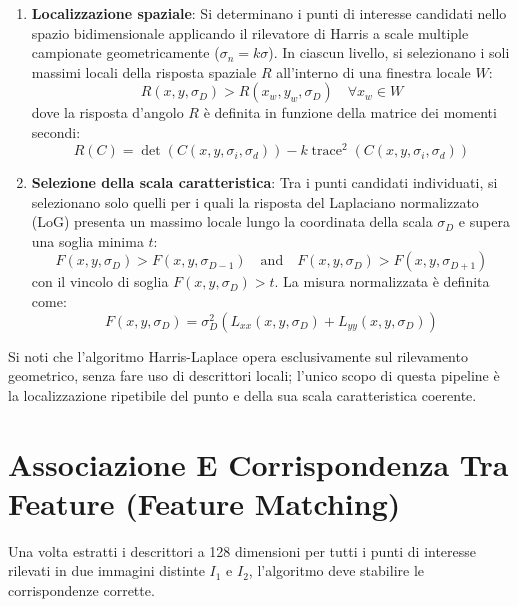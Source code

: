 ﻿\documentclass[11pt, a4paper]{article}
\begin{document}

\begin{enumerate}
    \item \textbf{Localizzazione spaziale}: Si determinano i punti di interesse candidati nello spazio bidimensionale applicando il rilevatore di Harris a scale multiple campionate geometricamente ($\sigma_n = k\sigma$). In ciascun livello, si selezionano i soli massimi locali della risposta spaziale $R$ all'interno di una finestra locale $W$:
    \[ R(x, y, \sigma_D) > R(x_w, y_w, \sigma_D) \quad \forall x_w \in W \]
    dove la risposta d'angolo $R$ è definita in funzione della matrice dei momenti secondi:
    \[ R(C) = \det\left(C(x, y, \sigma_i, \sigma_d)\right) - k \operatorname{trace}^2\left(C(x, y, \sigma_i, \sigma_d)\right) \]

    \item \textbf{Selezione della scala caratteristica}: Tra i punti candidati individuati, si selezionano solo quelli per i quali la risposta del Laplaciano normalizzato (LoG) presenta un massimo locale lungo la coordinata della scala $\sigma_D$ e supera una soglia minima $t$:
    \[ F(x, y, \sigma_D) > F(x, y, \sigma_{D-1}) \quad \text{and} \quad F(x, y, \sigma_D) > F(x, y, \sigma_{D+1}) \]
    con il vincolo di soglia $F(x, y, \sigma_D) > t$. La misura normalizzata è definita come:
    \[ F(x, y, \sigma_D) = \sigma_D^2 \left( L_{xx}(x, y, \sigma_D) + L_{yy}(x, y, \sigma_D) \right) \]
\end{enumerate}


Si noti che l'algoritmo Harris-Laplace opera esclusivamente sul rilevamento geometrico, senza fare uso di descrittori locali; l'unico scopo di questa pipeline è la localizzazione ripetibile del punto e della sua scala caratteristica coerente.

\newpage

\section{Associazione E Corrispondenza Tra Feature (Feature Matching)}

Una volta estratti i descrittori a 128 dimensioni per tutti i punti di interesse rilevati in due immagini distinte $I_1$ e $I_2$, l'algoritmo deve stabilire le corrispondenze corrette.
\end{document}
